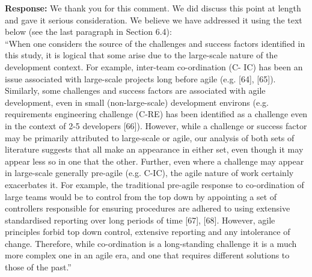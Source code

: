 \documentclass[a4paper,twoside,11pt]{reviewresponse}
\begin{document}
\textbf{Response:}
We thank you for this comment. We did discuss this point at length and gave it serious consideration. We believe we have addressed it using the text below (see the last paragraph in Section 6.4): \\

``When one considers the source of the challenges and success factors identified in this study, it is logical that some arise due to the large-scale nature of the development context. For example, inter-team co-ordination (C- IC) has been an issue associated with large-scale projects long before agile (e.g. [64], [65]). Similarly, some challenges and success factors are associated with agile development, even in small (non-large-scale) development environs (e.g. requirements engineering challenge (C-RE) has been identified as a challenge even in the context of 2-5 developers [66]). However, while a challenge or success factor may be primarily attributed to large-scale or agile, our analysis of both sets of literature suggests that all make an appearance in either set, even though it may appear less so in one that the other. Further, even where a challenge may appear in large-scale generally pre-agile (e.g. C-IC), the agile nature of work certainly exacerbates it. For example, the traditional pre-agile response to co-ordination of large teams would be to control from the top down by appointing a set of controllers responsible for ensuring procedures are adhered to using extensive standardised reporting over long periods of time [67], [68]. However, agile principles forbid top down control, extensive reporting and any intolerance of change. Therefore, while co-ordination is a long-standing challenge it is a much more complex one in an agile era, and one that requires different solutions to those of the past.''
\end{document}

